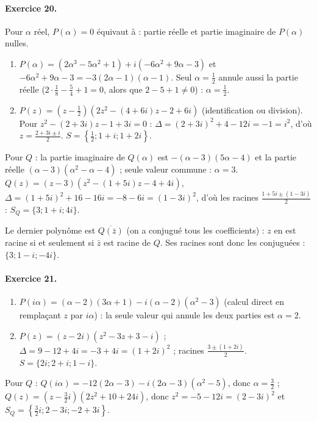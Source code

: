 \begin{corrige}
\paragraph{Exercice 20.}
Pour $\alpha$ r\'eel, $P(\alpha) = 0$ \'equivaut \`a : partie r\'eelle et partie imaginaire de $P(\alpha)$ nulles.
\begin{enumerate}
\item $P(\alpha) = (2\alpha^3 - 5\alpha^2 + 1) + i(-6\alpha^2 + 9\alpha - 3)$ et $-6\alpha^2 + 9\alpha - 3 = -3(2\alpha - 1)(\alpha - 1)$.
      Seul $\alpha = \frac{1}{2}$ annule aussi la partie r\'eelle ($2\cdot\frac{1}{8} - \frac{5}{4} + 1 = 0$, alors que $2 - 5 + 1 \neq 0$) : $\boxed{\alpha = \frac{1}{2}}$.
\item $P(z) = \left(z - \frac{1}{2}\right)\left(2z^2 - (4+6i)z - 2 + 6i\right)$ (identification ou division).
      Pour $z^2 - (2+3i)z - 1 + 3i = 0$ : $\Delta = (2+3i)^2 + 4 - 12i = -1 = i^2$, d'o\`u $z = \frac{2 + 3i \pm i}{2}$.
      $S = \left\{\frac{1}{2} ; 1 + i ; 1 + 2i\right\}$.
\end{enumerate}
Pour $Q$ : la partie imaginaire de $Q(\alpha)$ est $-(\alpha - 3)(5\alpha - 4)$ et la partie r\'eelle $(\alpha - 3)(\alpha^2 - \alpha - 4)$ ; seule valeur commune : $\alpha = 3$.
$Q(z) = (z - 3)\left(z^2 - (1+5i)z - 4 + 4i\right)$, $\Delta = (1+5i)^2 + 16 - 16i = -8 - 6i = (1 - 3i)^2$, d'o\`u les racines $\frac{1 + 5i \pm (1 - 3i)}{2}$ :
$S_Q = \{3 ; 1 + i ; 4i\}$.

Le dernier polyn\^ome est $\overline{Q(\bar{z})}$ (on a conjugu\'e tous les coefficients) : $z$ en est racine si et seulement si $\bar{z}$ est racine de $Q$.
Ses racines sont donc les conjugu\'ees : $\{3 ; 1 - i ; -4i\}$.

\paragraph{Exercice 21.}
\begin{enumerate}
\item $P(i\alpha) = (\alpha - 2)(3\alpha + 1) - i(\alpha - 2)(\alpha^2 - 3)$ (calcul direct en rempla\c{c}ant $z$ par $i\alpha$) : la seule valeur qui annule
      les deux parties est $\boxed{\alpha = 2}$.
\item $P(z) = (z - 2i)\left(z^2 - 3z + 3 - i\right)$ ; $\Delta = 9 - 12 + 4i = -3 + 4i = (1 + 2i)^2$ ; racines $\frac{3 \pm (1 + 2i)}{2}$.
      $S = \{2i ; 2 + i ; 1 - i\}$.
\end{enumerate}
Pour $Q$ : $Q(i\alpha) = -12(2\alpha - 3) - i(2\alpha - 3)(\alpha^2 - 5)$, donc $\alpha = \frac{3}{2}$ ;
$Q(z) = \left(z - \frac{3}{2}i\right)\left(2z^2 + 10 + 24i\right)$, donc $z^2 = -5 - 12i = (2 - 3i)^2$ et $S_Q = \left\{\frac{3}{2}i ; 2 - 3i ; -2 + 3i\right\}$.


\end{corrige}

